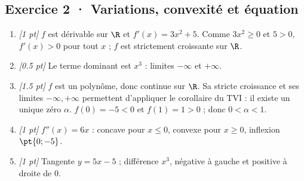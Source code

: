 \subsection*{Exercice 2 · Variations, convexité et équation}\begin{enumerate}

\item \textit{[1 pt]} $f$ est dérivable sur $\R$ et $f'(x)=3x^2+5$. Comme $3x^2\ge0$ et $5>0$, $f'(x)>0$ pour tout $x$ ; $f$ est strictement croissante sur $\R$.

\item \textit{[\num{0,5} pt]} Le terme dominant est $x^3$ : limites $-\infty$ et $+\infty$.

\item \textit{[\num{1,5} pt]} $f$ est un polynôme, donc continue sur $\R$. Sa stricte croissance et ses limites $-\infty,+\infty$ permettent d'appliquer le corollaire du TVI : il existe un unique zéro $\alpha$. $f(0)=-5<0$ et $f(1)=1>0$ ; donc $0<\alpha<1$.

\item \textit{[1 pt]} $f''(x)=6x$ : concave pour $x\le0$, convexe pour $x\ge0$, inflexion $\pt{0;-5}$.

\item \textit{[1 pt]} Tangente $y=5x-5$ ; différence $x^3$, négative à gauche et positive à droite de $0$.

\end{enumerate}

